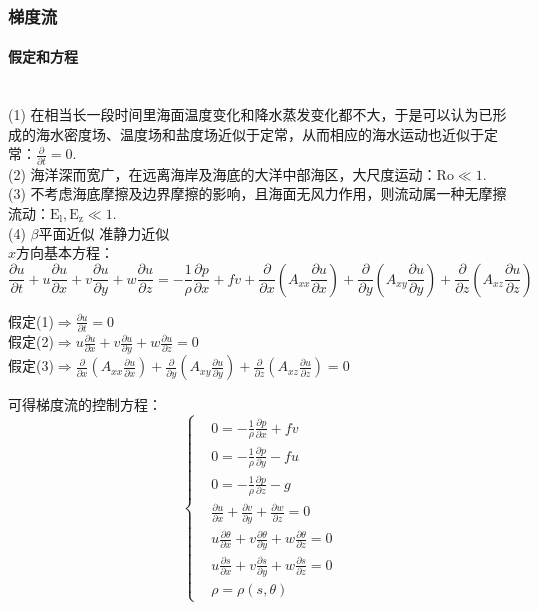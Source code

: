 \documentclass[a4paper,12pt]{article}
\begin{document}
    \subsubsection{梯度流}
    \paragraph{假定和方程}~{} \\
    (1) 在相当长一段时间里海面温度变化和降水蒸发变化都不大，于是可以认为已形成的海水密度场、温度场和盐度场近似于定常，从而相应的海水运动也近似于定常：$\displaystyle \frac{\partial }{\partial t}=0$.\\
    (2) 海洋深而宽广，在远离海岸及海底的大洋中部海区，大尺度运动：$\displaystyle \mathrm{Ro}\ll 1$.\\
    (3) 不考虑海底摩擦及边界摩擦的影响，且海面无风力作用，则流动属一种无摩擦流动：$\displaystyle \mathrm{E_l,E_z \ll 1}$.\\
    (4) $\beta$平面近似 准静力近似\\
    $x$方向基本方程：
    \[
        \frac{\partial {u}}{\partial t}+{u} \frac{\partial {u}}{\partial {x}}+{v} \frac{\partial {u}}{\partial {y}}+{w} \frac{\partial {u}}{\partial z}=-\frac{1}{\rho} \frac{\partial {p}}{\partial {x}}+{f} {v}+\frac{\partial}{\partial {x}}\left({A}_{x x} \frac{\partial {u}}{\partial {x}}\right)+\frac{\partial}{\partial {y}}\left({A}_{x y} \frac{\partial {u}}{\partial {y}}\right)+\frac{\partial}{\partial z}\left({A}_{x z} \frac{\partial {u}}{\partial z}\right)
    \]
    \begin{spacing}{2.5}
        假定(1)$\Rightarrow\displaystyle\frac{\partial {u}}{\partial t}=0$\\
        假定(2)$\Rightarrow\displaystyle{u}\frac{\partial {u}}{\partial {x}}+{v} \frac{\partial {u}}{\partial{y}}+{w}\frac{\partial{u}}{\partial z}=0$\\
        假定(3)$\Rightarrow\displaystyle\frac{\partial}{\partial {x}}\left({A}_{x x} \frac{\partial {u}}{\partial {x}}\right)+\frac{\partial}{\partial {y}}\left({A}_{x y} \frac{\partial {u}}{\partial {y}}\right)+\frac{\partial}{\partial z}\left({A}_{x z} \frac{\partial {u}}{\partial z}\right)=0$
    \end{spacing}
    可得梯度流的控制方程：
    \[
        \left\{\begin{aligned}&0=-\frac{1}{\rho} \frac{\partial p}{\partial x}+f v \\ &0=-\frac{1}{\rho} \frac{\partial p}{\partial y}-f u \\ &0=-\frac{1}{\rho} \frac{\partial p}{\partial z}-g \\ &\frac{\partial u}{\partial x}+\frac{\partial v}{\partial y}+\frac{\partial w}{\partial z}=0 \\ &u \frac{\partial \theta}{\partial x}+v \frac{\partial \theta}{\partial y}+w \frac{\partial \theta}{\partial z}=0 \\ &u \frac{\partial s}{\partial x}+v \frac{\partial s}{\partial y}+w \frac{\partial s}{\partial z}=0 \\& \rho=\rho(s, \theta)\end{aligned}\right.
    \]
\end{document}
